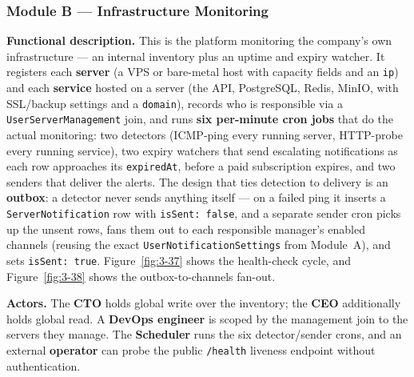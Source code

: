 
\subsubsection{Module B --- Infrastructure Monitoring}

\textbf{Functional description.} This is the platform monitoring the company's own
infrastructure --- an internal inventory plus an uptime and expiry watcher. It registers each
\textbf{server} (a VPS or bare-metal host with capacity fields and an \texttt{ip}) and each
\textbf{service} hosted on a server (the API, PostgreSQL, Redis, MinIO, with SSL/backup
settings and a \texttt{domain}), records who is responsible via a
\texttt{UserServerManagement} join, and runs \textbf{six per-minute cron jobs} that do the
actual monitoring: two detectors (ICMP-ping every running server, HTTP-probe every running
service), two expiry watchers that send escalating notifications as each row approaches its
\texttt{expiredAt}, before a paid subscription expires, and two senders that deliver the alerts.
The design that ties detection to delivery is an \textbf{outbox}: a detector never sends
anything itself --- on a failed ping it inserts a \texttt{ServerNotification} row with
\texttt{isSent:\,false}, and a separate sender cron picks up the unsent rows, fans them out to
each responsible manager's enabled channels (reusing the exact
\texttt{UserNotificationSettings} from Module~A), and sets \texttt{isSent:\,true}.
Figure~\ref{fig:3-37} shows the health-check cycle, and Figure~\ref{fig:3-38} shows the
outbox-to-channels fan-out.

\textbf{Actors.} The \textbf{CTO} holds global write over the inventory; the \textbf{CEO}
additionally holds global read. A \textbf{DevOps engineer} is scoped by the management join to
the servers they manage. The \textbf{Scheduler} runs the six detector/sender crons, and an
external \textbf{operator} can probe the public \texttt{/health} liveness endpoint without
authentication.

